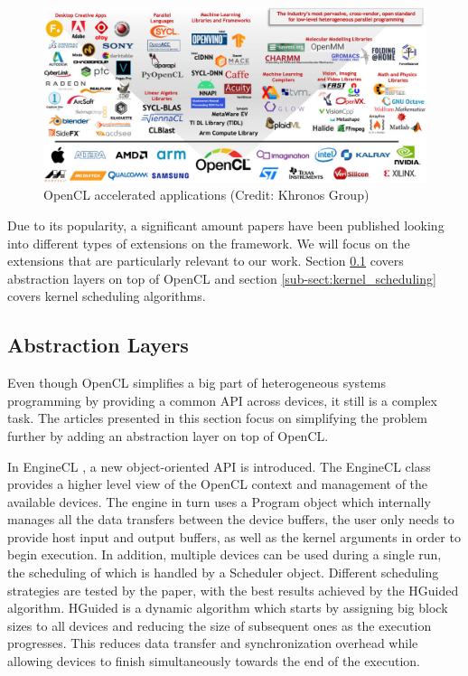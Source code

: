 \begin{figure}[ht]
    \centering
    \includegraphics[width=\textwidth]{img/opencl-accelerated-apps.png}
    \captionsetup{justification=centering}
    \caption{OpenCL accelerated applications (Credit: Khronos Group)}
\end{figure}

Due to its popularity, a significant amount papers have been published looking into different types of extensions on the framework. We will focus on the extensions that are particularly relevant to our work. Section \ref{sub-sect:abstraction-layers} covers abstraction layers on top of OpenCL and section \ref{sub-sect:kernel_scheduling} covers kernel scheduling algorithms.

\subsection{Abstraction Layers} \label{sub-sect:abstraction-layers}
Even though OpenCL simplifies a big part of heterogeneous systems programming by providing a common API across devices, it still is a complex task. 
The articles presented in this section focus on simplifying the problem further by adding an abstraction layer on top of OpenCL.

In EngineCL \cite{enginecl}, a new object-oriented API is introduced. The EngineCL class provides a higher level view of the OpenCL context and management of the available devices. The engine in turn uses a Program object which internally manages all the data transfers between the device buffers, the user only needs to provide host input and output buffers, as well as the kernel arguments in order to begin execution. In addition, multiple devices can be used during a single run, the scheduling of which is handled by a Scheduler object. Different scheduling strategies are tested by the paper, with the best results achieved by the HGuided algorithm. HGuided is a dynamic algorithm which starts by assigning big block sizes to all devices and reducing the size of subsequent ones as the execution progresses. This reduces data transfer and synchronization overhead while allowing devices to finish simultaneously towards the end of the execution.

